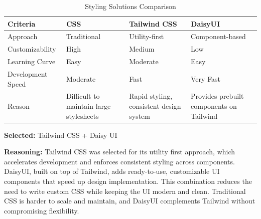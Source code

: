 \begin{table}[H]
\centering
\caption{Styling Solutions Comparison}
\begin{tabular}{|l|p{4cm}|p{4cm}|p{4cm}|}
\hline
\textbf{Criteria}       & \textbf{CSS}               & \textbf{Tailwind CSS}        & \textbf{DaisyUI}             \\
\hline
Approach                & Traditional                & Utility-first                & Component-based              \\
Customizability         & High                       & Medium                      & Low                         \\
Learning Curve          & Easy                       & Moderate                    & Easy                        \\
Development Speed       & Moderate                   & Fast                        & Very Fast                   \\
Reason                  & Difficult to maintain large stylesheets & Rapid styling, consistent design system & Provides prebuilt components on Tailwind \\
\hline
\end{tabular}
\label{tab:styling-solutions-comparison}
\end{table}

\textbf{Selected:} Tailwind CSS + Daisy UI \par
\textbf{Reasoning:} Tailwind CSS was selected for its utility first approach, which accelerates development and enforces consistent styling across components. DaisyUI, built on top of Tailwind, adds ready-to-use, customizable UI components that speed up design implementation. This combination reduces the need to write custom CSS while keeping the UI modern and clean. Traditional CSS is harder to scale and maintain, and DaisyUI complements Tailwind without compromising flexibility.

\vspace{2em}

